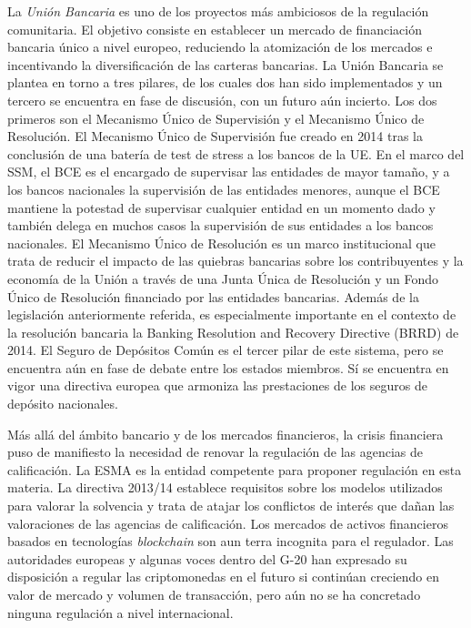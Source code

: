 \documentclass{nuevotema}
\begin{document}
La \textit{Unión Bancaria} es uno de los proyectos más ambiciosos de la regulación comunitaria. El objetivo consiste en establecer un mercado de financiación bancaria único a nivel europeo, reduciendo la atomización de los mercados e incentivando la diversificación de las carteras bancarias. La Unión Bancaria se plantea en torno a tres pilares, de los cuales dos han sido implementados y un tercero se encuentra en fase de discusión, con un futuro aún incierto. Los dos primeros son el Mecanismo Único de Supervisión y el Mecanismo Único de Resolución. El Mecanismo Único de Supervisión fue creado en 2014 tras la conclusión de una batería de test de stress a los bancos de la UE. En el marco del SSM, el BCE es el encargado de supervisar las entidades de mayor tamaño, y a los bancos nacionales la supervisión de las entidades menores, aunque el BCE mantiene la potestad de supervisar cualquier entidad en un momento dado y también delega en muchos casos la supervisión de sus entidades a los bancos nacionales. El Mecanismo Único de Resolución es un marco institucional que trata de reducir el impacto de las quiebras bancarias sobre los contribuyentes y la economía de la Unión a través de una Junta Única de Resolución y un Fondo Único de Resolución financiado por las entidades bancarias. Además de la legislación anteriormente referida, es especialmente importante en el contexto de la resolución bancaria la Banking Resolution and Recovery Directive (BRRD) de 2014. El Seguro de Depósitos Común es el tercer pilar de este sistema, pero se encuentra aún en fase de debate entre los estados miembros. Sí se encuentra en vigor una directiva europea que armoniza las prestaciones de los seguros de depósito nacionales. 

Más allá del ámbito bancario y de los mercados financieros, la crisis financiera puso de manifiesto la necesidad de renovar la regulación de las agencias de calificación. La ESMA es la entidad competente para proponer regulación en esta materia. La directiva 2013/14 establece requisitos sobre los modelos utilizados para valorar la solvencia y trata de atajar los conflictos de interés que dañan las valoraciones de las agencias de calificación. Los mercados de activos financieros basados en tecnologías \textit{blockchain} son aun terra incognita para el regulador. Las autoridades europeas y algunas voces dentro del G-20 han expresado su disposición a regular las criptomonedas en el futuro si continúan creciendo en valor de mercado y volumen de transacción, pero aún no se ha concretado ninguna regulación a nivel internacional. 
\end{document}
